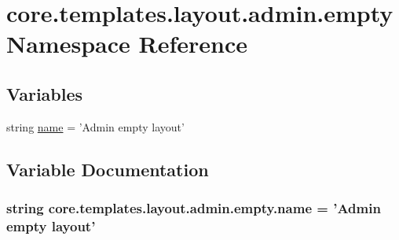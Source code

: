 \hypertarget{namespacecore_1_1templates_1_1layout_1_1admin_1_1empty}{\section{core.\-templates.\-layout.\-admin.\-empty Namespace Reference}
\label{namespacecore_1_1templates_1_1layout_1_1admin_1_1empty}
}
\subsection*{Variables}
\begin{DoxyCompactItemize}
\item 
string \hyperlink{namespacecore_1_1templates_1_1layout_1_1admin_1_1empty_a6b6dee13512e187e08c8f71c5f63cd64}{name} = 'Admin empty layout'
\end{DoxyCompactItemize}


\subsection{Variable Documentation}
\hypertarget{namespacecore_1_1templates_1_1layout_1_1admin_1_1empty_a6b6dee13512e187e08c8f71c5f63cd64}{
\subsubsection[{name}]{\setlength{\rightskip}{0pt plus 5cm}string core.\-templates.\-layout.\-admin.\-empty.\-name = 'Admin empty layout'}}\label{namespacecore_1_1templates_1_1layout_1_1admin_1_1empty_a6b6dee13512e187e08c8f71c5f63cd64}
